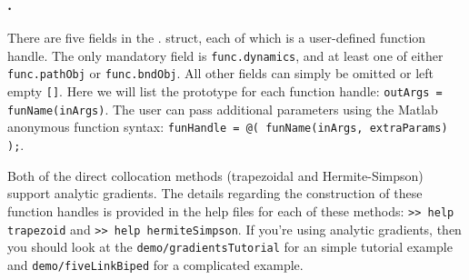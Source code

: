 \subsubsection*{.}

There are five fields in the . struct, each of which is a user-defined function handle. The only mandatory field is \texttt{func.dynamics}, and at least one of either \texttt{func.pathObj} or \texttt{func.bndObj}. All other fields can simply be omitted or left empty \texttt{[]}. Here we will list the prototype for each function handle: \texttt{outArgs = funName(inArgs)}. The user can pass additional parameters using the Matlab anonymous function syntax: \texttt{funHandle = @( funName(inArgs, extraParams) );}.

\par Both of the direct collocation methods (trapezoidal and Hermite-Simpson) support analytic gradients. The details regarding the construction of these function handles is provided in the help files for each of these methods: \texttt{>> help trapezoid} and \texttt{>> help hermiteSimpson}. If you're using analytic gradients, then you should look at the \texttt{demo/gradientsTutorial} for an simple tutorial example and \texttt{demo/fiveLinkBiped} for a complicated example.

